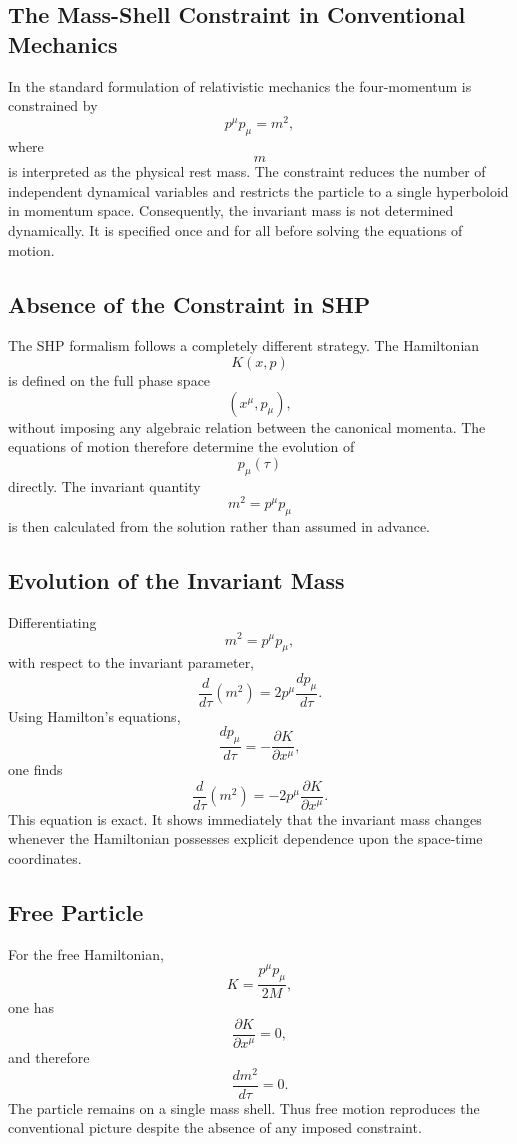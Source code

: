 \subsection{The Mass-Shell Constraint in Conventional Mechanics}
In the standard formulation of relativistic mechanics the four-momentum
is constrained by
\[\boxed{p^\mu p_\mu = m^2,}\]
where
\[m\]
is interpreted as the physical rest mass.
The constraint reduces the number of independent dynamical variables and
restricts the particle to a single hyperboloid in momentum space.
Consequently, the invariant mass is not determined dynamically.
It is specified once and for all before solving the equations of motion.
\subsection{Absence of the Constraint in SHP}
The SHP formalism follows a completely different strategy.
The Hamiltonian
\[K(x,p)\]
is defined on the full phase space
\[(x^\mu,p_\mu),\]
without imposing any algebraic relation between the canonical momenta.
The equations of motion therefore determine the evolution of
\[p_\mu(\tau)\]
directly.
The invariant quantity
\[m^2=p^\mu p_\mu\]
is then calculated from the solution rather than assumed in advance.
\subsection{Evolution of the Invariant Mass}
Differentiating
\[m^2=p^\mu p_\mu,\]
with respect to the invariant parameter,
\[\frac{d}{d\tau}(m^2)=2p^\mu\frac{dp_\mu}{d\tau}.\]
Using Hamilton's equations,
\[\frac{dp_\mu}{d\tau}=-\frac{\partial K}{\partial x^\mu},\]
one finds
\[\boxed{\frac{d}{d\tau}(m^2)=-2p^\mu\frac{\partial K}{\partial x^\mu}.}\]
This equation is exact.
It shows immediately that the invariant mass changes whenever the
Hamiltonian possesses explicit dependence upon the space-time
coordinates.
\subsection{Free Particle}
For the free Hamiltonian,
\[K=\frac{p^\mu p_\mu}{2M},\]
one has
\[\frac{\partial K}{\partial x^\mu}=0,\]
and therefore
\[\boxed{\frac{dm^2}{d\tau}=0.}\]
The particle remains on a single mass shell.
Thus free motion reproduces the conventional picture despite the absence
of any imposed constraint.
